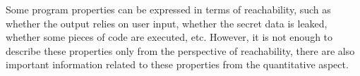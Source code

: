  
 Some program properties can be expressed in terms of reachability,
such as
whether the output relies on user input, whether the secret data is leaked, 
whether some pieces of code are executed, etc.
However, it is not enough to describe these properties only
from the perspective of reachability,
there are also
important information related to these properties from the quantitative aspect.

